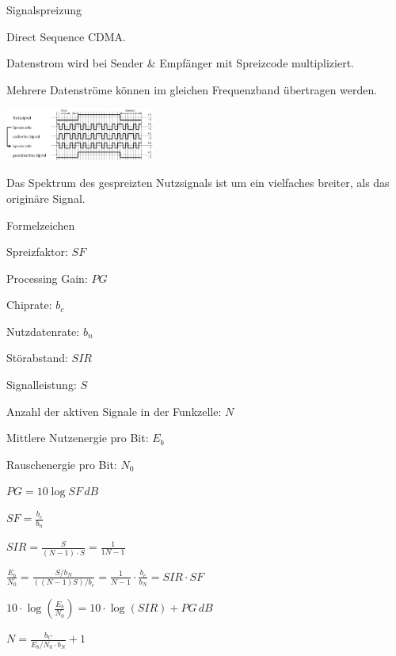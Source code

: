 \documentclass[german]{latex4ei/latex4ei_sheet}
\begin{document}
    \begin{sectionbox}
        \begin{bluebox}{Signalspreizung}
            \item Direct Sequence CDMA.
            \item Datenstrom wird bei Sender \& Empfänger mit Spreizcode multipliziert.
            \item Mehrere Datenströme können im gleichen Frequenzband übertragen werden.
            \item \includegraphics[width=185px]{img/Signalspreizung.png}
            \item Das Spektrum des gespreizten Nutzsignals ist um ein vielfaches breiter, als das originäre Signal. 
        \end{bluebox}
        \begin{symbolbox}{Formelzeichen}
            \item Spreizfaktor: $SF$
            \item Processing Gain: $PG$
            \item Chiprate: $b_c$
            \item Nutzdatenrate: $b_n$
            \item Störabstand: $SIR$
            \item Signalleistung: $S$
            \item Anzahl der aktiven Signale in der Funkzelle: $N$
            \item Mittlere Nutzenergie pro Bit: $E_b$
            \item Rauschenergie pro Bit: $N_0$
        \end{symbolbox}
        
        \begin{bluebox}
            \item $PG = 10\log SF\,dB$
            \item $SF = \frac{b_c}{b_n}$
            \item $SIR = \frac{S}{(N-1)\cdot S}= \frac{1}{1 N-1}$
            \item $\frac{E_b}{N_0} = \frac{S/b_N}{((N-1)S)/b_c} = \frac{1}{N-1}\cdot \frac{b_c}{b_N} = SIR \cdot SF$
            \item $10 \cdot \log \left(\frac{E_b}{N_0}\right) = 10\cdot \log (SIR)+ PG\,dB$
            \item $N = \frac{b_C}{E_b/N_0\cdot b_N}+1$
        \end{bluebox}
    \end{sectionbox}
\vspace{4cm}
\end{document}
